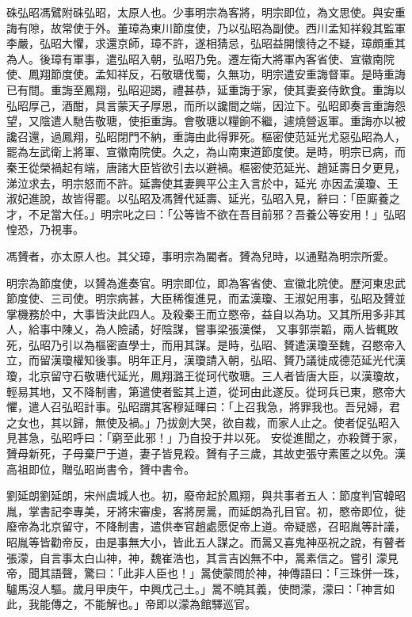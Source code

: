 
\begin{pinyinscope}

 硃弘昭馮鷿附硃弘昭，太原人也。少事明宗為客將，明宗即位，為文思使。與安重誨有隙，故常使于外。董璋為東川節度使，乃以弘昭為副使。西川孟知祥殺其監軍李嚴，弘昭大懼，求還京師，璋不許，遂相猜忌，弘昭益開懷待之不疑，璋頗重其為人。後璋有軍事，遣弘昭入朝，弘昭乃免。遷左衛大將軍內客省使、宣徽南院使、鳳翔節度使。孟知祥反，石敬瑭伐蜀，久無功，明宗遣安重誨督軍。是時重誨
 已有間。重誨至鳳翔，弘昭迎謁，禮甚恭，延重誨于家，使其妻妾侍飲食。重誨以弘昭厚己，酒酣，具言蒙天子厚恩，而所以讒間之端，因泣下。弘昭即奏言重誨怨望，又陰遣人馳告敬瑭，使拒重誨。會敬瑭以糧餉不繼，遽燒營返軍。重誨亦以被讒召還，過鳳翔，弘昭閉門不納，重誨由此得罪死。樞密使范延光尤惡弘昭為人，罷為左武衛上將軍、宣徽南院使。久之，為山南東道節度使。是時，明宗已病，而秦王從榮禍起有端，唐諸大臣皆欲引去以避禍。樞密使范延光、趙延壽日夕更見，涕泣求去，明宗怒而不許。延壽使其妻興平公主入言於中，延光
 亦因孟漢瓊、王淑妃進說，故皆得罷。以弘昭及馮贇代延壽、延光，弘昭入見，辭曰：「臣廝養之才，不足當大任。」明宗叱之曰：「公等皆不欲在吾目前邪？吾養公等安用！」弘昭惶恐，乃視事。



 馮贇者，亦太原人也。其父璋，事明宗為閽者。贇為兒時，以通黠為明宗所愛。



 明宗為節度使，以贇為進奏官。明宗即位，即為客省使、宣徽北院使。歷河東忠武節度使、三司使。明宗病甚，大臣稀復進見，而孟漢瓊、王淑妃用事，弘昭及贇並掌機務於中，大事皆決此四人。及殺秦王而立愍帝，益自以為功。又其所用多非其人，給事中陳乂，為人險譎，好陰謀，嘗事梁張漢傑，
 又事郭崇韜，兩人皆輒敗死，弘昭乃引以為樞密直學士，而用其謀。是時，弘昭、贇遣漢瓊至魏，召愍帝入立，而留漢瓊權知後事。明年正月，漢瓊請入朝，弘昭、贇乃議徙成德范延光代漢瓊，北京留守石敬瑭代延光，鳳翔潞王從珂代敬瑭。三人者皆唐大臣，以漢瓊故，輕易其地，又不降制書，第遣使者監其上道，從珂由此遂反。從珂兵已東，愍帝大懼，遣人召弘昭計事。弘昭謂其客穆延暉曰：「上召我急，將罪我也。吾兒婦，君之女也，其以歸，無使及禍。」乃拔劍大哭，欲自裁，而家人止之。使者促弘昭入見甚急，弘昭呼曰：「窮至此邪！」乃自投于井以死。
 安從進聞之，亦殺贇于家，贇母新死，子母棄尸于道，妻子皆見殺。贇有子三歲，其故吏張守素匿之以免。漢高祖即位，贈弘昭尚書令，贇中書令。



 劉延朗劉延朗，宋州虞城人也。初，廢帝起於鳳翔，與共事者五人：節度判官韓昭胤，掌書記李專美，牙將宋審虔，客將房暠，而延朗為孔目官。初，愍帝即位，徙廢帝為北京留守，不降制書，遣供奉官趙處愿促帝上道。帝疑惑，召昭胤等計議，昭胤等皆勸帝反，由是事無大小，皆此五人謀之。而暠又喜鬼神巫祝之說，有瞽者張濛，自言事太白山神，神，魏崔浩也，其言吉凶無不中，暠素信之。嘗引
 濛見帝，聞其語聲，驚曰：「此非人臣也！」暠使蒙問於神，神傳語曰：「三珠併一珠，驢馬沒人驅。歲月甲庚午，中興戊己土。」暠不曉其義，使問濛，濛曰：「神言如此，我能傳之，不能解也。」帝即以濛為館驛巡官。




\end{pinyinscope}
